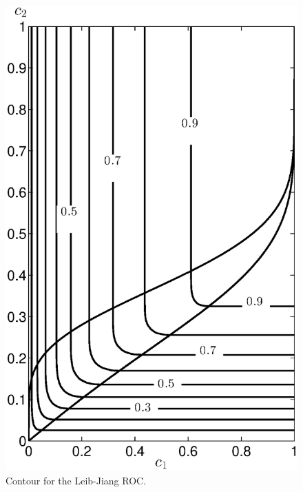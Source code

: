 \documentclass[12pt,journal,a4paper,twoside,onecolumn]{IEEEtran}
\begin{document}
\begin{spacing}{2.5}
\begin{figure}[!t]
\centering
\includegraphics[width=12cm]{LJcontour.eps}
\caption{Contour for the Leib-Jiang ROC.}
\label{pic: LJS contour}
\end{figure}



\end{spacing}
\end{document}
